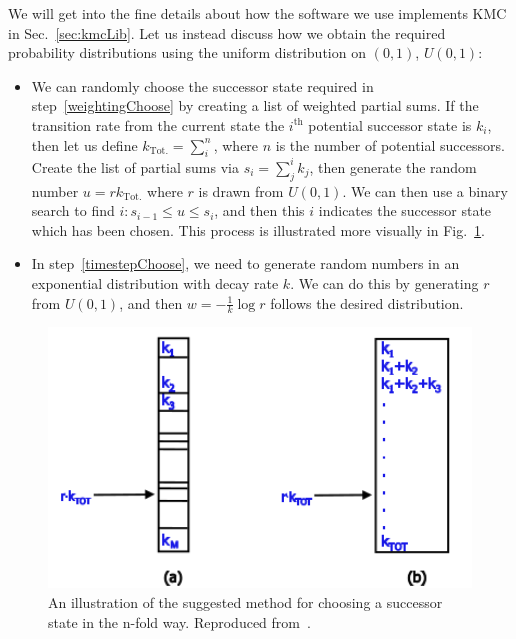 We will get into the fine details about how the software we use implements KMC in Sec.~\ref{sec:kmcLib}.
Let us instead discuss how we obtain the required probability distributions using the uniform distribution
on $(0, 1)$, $U(0, 1)$:
\begin{itemize}
 \item We can randomly choose the successor state required in step~\ref{weightingChoose} by
 creating a list of weighted partial sums. If the transition rate from the current state the $i^\mathrm{th}$
 potential successor state is $k_i$, then let us define $k_\mathrm{Tot.} = \sum_{i}^n$, where $n$ is the
 number of potential successors. Create the list of partial sums via $s_i = \sum_j^i k_j$, then generate
 the random number $u = r k_\mathrm{Tot.}$ where $r$ is drawn from $U(0, 1)$. We can then use a binary
 search to find $i: s_{i-1} \le u \le s_i$, and then this $i$ indicates the successor state which has been
 chosen. This process is illustrated more visually in Fig.~\ref{fig:weightChoice}.
 \item In step~\ref{timestepChoose}, we need to generate random numbers in an exponential distribution
 with decay rate $k$. We can do this by generating $r$ from $U(0, 1)$, and then $w = -\frac{1}{k} \log{r}$
 follows the desired distribution.
\end{itemize}
\begin{figure}[h!]
 \caption[Illustration of the method for choosing successor states in the n-fold way.]{\label{fig:weightChoice} 
 An illustration of the suggested method for choosing a successor state in the n-fold way. Reproduced
 from~\cite{voterKMC}.
 }
  \begin{center}
 \includegraphics[width=1.0\textwidth]{numerics/images/nFoldWayRates}
  \end{center}
\end{figure}

